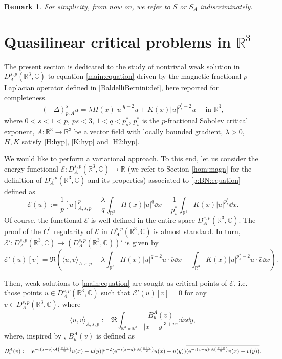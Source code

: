\documentclass[leqno,11pt]{amsart}
\newcommand{\R}{\mathbb R}
\newcommand{\C}{\mathbb C}
\newcommand{\cE}{{\mathcal E}}
\numberwithin{equation}{section}
\newtheorem{remark}[theorem]{Remark}
\def\e{{\rm e}}
\newcommand{\expAminus}{\e^{-i(x-y)\cdot A\left(\frac{x+y}{2}\right)}}
\begin{document}
\begin{remark}
For simplicity, from now on, we refer to $S$ or $S_A$ indiscriminately.
\end{remark}



\section{Quasilinear critical problems in \texorpdfstring{$\R^3$}{R3}}
\label{Sect:BN}

The present section is dedicated to the study of nontrivial weak solution in $D^{s,p}_A(\R^3,\C)$ to equation \eqref{main:equation} driven by the magnetic fractional $p$-Laplacian operator defined in \eqref{BaldelliBernini:def}, here reported for completeness.
\begin{equation}
    \label{p:BN:equation}
    (-\Delta)^s_{p,A}u =\lambda H(x)|u|^{q-2}u+K(x)|u|^{p^*_s-2}u\quad \text{ in } \R^3,
\end{equation}
where $0<s<1<p$, $ps<3$, $1<q<p^*_s$,  $p^*_s$ is the $p$-fractional Sobolev critical exponent, $A:\R^3 \to \R^3$ be a vector field with locally bounded gradient, $\lambda>0$, $H,K$ satisfy \eqref{H:hyp}, \eqref{K:hyp} and \eqref{H2:hyp}.



We would like to perform a variational approach. To this end, let us consider the energy functional $\cE:D^{s,p}_A(\R^3,\C) \to \R$ (we refer to Section \ref{hom:magn} for the definition of $D^{s,p}_A(\R^3,\C)$ and its properties) associated to \eqref{p:BN:equation} defined as
\begin{equation}
    \label{energy:functional:BN}
    \cE(u):=\frac1p[u]_{A,s,p}^p - \frac{\lambda}{q}\int_{\R^3}H(x)|u|^q \dd x - \frac{1}{p^*_{s}}\int_{\R^3}K(x) |u|^{p^*_{s}} \dd x.
\end{equation}
Of course, the functional $\cE$ is  well defined in the entire space $D^{s,p}_A(\R^3,\C)$. The proof of the $C^1$ regularity of $\cE$ in $D^{s,p}_A(\R^3,\C)$ is almost standard.
In turn, $\cE': D^{s,p}_A(\R^3,\C)\to (D^{s,p}_A(\R^3,\C))'$ is given by
$$  \cE'(u)[v]=\Re\left( \langle u, v\rangle_{A,s,p} - \lambda\int_{\R^3} H(x)|u|^{q-2}u\cdot\overline v \dd x 
  -\int_{\R^3}K(x) |u|^{p^*_{s}-2}u\cdot\bar v \dd x
  \right).$$

Then, weak solutions to \eqref{main:equation} are sought as critical points of $\cE$, i.e. those points $u \in D^{s,p}_A(\R^3,\C)$ such that $\cE'(u)[v]=0$
for any $v\in D^{s,p}_A(\R^3,\C)$, where
$$
    \langle u, v\rangle_{A,s,p} :=\Re\int_{\R^3\times \R^3}\frac{B^A_u(v)}{|x-y|^{3+ps}} \dd x \dd y,
$$
where, inspired by \cite{PucciXiangZhang}, $B^A_u(v)$ is defined as
$$
    B^A_u(v):=|\expAminus u(x) - u(y)|^{p-2}(\expAminus u(x) -  u(y))\overline{(\expAminus v(x) -  v(y))}.
$$
\end{document}
